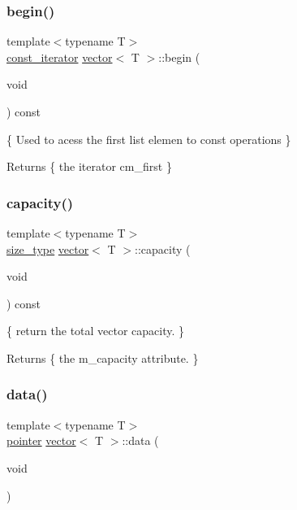 \subsubsection{\texorpdfstring{begin()}{begin()}\hspace{0.1cm}{\footnotesize\ttfamily [2/2]}}
{\footnotesize\ttfamily template$<$typename T$>$ \\
\hyperlink{classMyIterator}{const\+\_\+iterator} \hyperlink{classvector}{vector}$<$ T $>$\+::begin (\begin{DoxyParamCaption}\item[{void}]{ }\end{DoxyParamCaption}) const\hspace{0.3cm}{\ttfamily [inline]}}



\{ Used to acess the first list elemen to const operations \} 

\begin{DoxyReturn}{Returns}
\{ the iterator cm\+\_\+first \} 
\end{DoxyReturn}
\mbox{\label{classvector_a07f59d5072ec6ce9a895bb25e730871d}} 
\subsubsection{\texorpdfstring{capacity()}{capacity()}}
{\footnotesize\ttfamily template$<$typename T$>$ \\
\hyperlink{classvector_a4d06f3ade0c2ac023b7a7edb85d9d1ef}{size\+\_\+type} \hyperlink{classvector}{vector}$<$ T $>$\+::capacity (\begin{DoxyParamCaption}\item[{void}]{ }\end{DoxyParamCaption}) const\hspace{0.3cm}{\ttfamily [inline]}}



\{ return the total vector capacity. \} 

\begin{DoxyReturn}{Returns}
\{ the m\+\_\+capacity attribute. \} 
\end{DoxyReturn}
\mbox{\label{classvector_a6b02121f443657a7462a2f2a7fcae1d4}} 
\subsubsection{\texorpdfstring{data()}{data()}\hspace{0.1cm}{\footnotesize\ttfamily [1/2]}}
{\footnotesize\ttfamily template$<$typename T$>$ \\
\hyperlink{classvector_a6826d03fa03dbe9e6e21328770c2f308}{pointer} \hyperlink{classvector}{vector}$<$ T $>$\+::data (\begin{DoxyParamCaption}\item[{void}]{ }\end{DoxyParamCaption})\hspace{0.3cm}{\ttfamily [inline]}}



